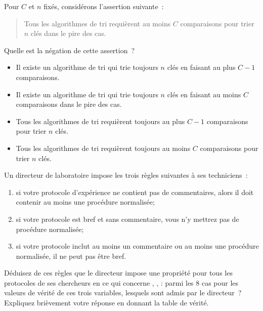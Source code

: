 \documentclass[12pt,french,oneside,a4paper]{memoir} %
\begin{document}
\begin{exo}
  Pour $C$ et $n$ fixés, considérons l'assertion suivante~:
  \begin{quote}
    Tous les algorithmes de tri requièrent au moins $C$ comparaisons pour trier $n$ clés dans le pire des cas.
  \end{quote}

  Quelle est la négation de cette assertion~?

  \begin{itemize}
  \item Il existe un algorithme de tri qui trie toujours $n$ clés en faisant au plus $C-1$ comparaisons.
  \item Il existe un algorithme de tri qui trie toujours $n$ clés en faisant au moins $C$ comparaisons dans le pire des cas.
  \item Tous les algorithmes de tri requièrent toujours au plus $C-1$ comparaisons pour trier $n$ clés.
  \item Tous les algorithmes de tri requièrent toujours au moins $C$ comparaisons pour trier $n$ clés.
  \end{itemize}
\end{exo}


\begin{exo}
  Un directeur de laboratoire impose les trois règles suivantes à ses techniciens~:
  \begin{enumerate}
  \item si votre protocole d'expérience ne contient pas de commentaires, alors il doit contenir au moins une procédure normalisée;
  \item si votre protocole est bref et sans commentaire, vous n'y mettrez pas de procédure normalisée;
  \item si votre protocole inclut au moins un commentaire ou au moins une procédure normalisée, il ne peut pas être bref.
  \end{enumerate}

  Déduisez de ces règles que le directeur impose une propriété pour tous les protocoles de ses chercheurs en ce qui concerne \fg{}, \fg{}, \fg{} : parmi les 8 cas pour les valeurs de vérité de ces trois variables, lesquels sont admis par le directeur~? Expliquez brièvement votre réponse en donnant la table de vérité.
\end{exo}
\end{document}
